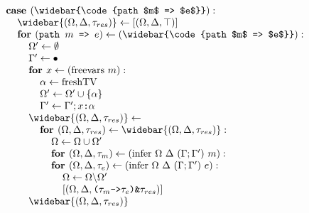 \documentclass[acmsmall]{acmart}
\begin{document}
\begin{figure*}[h]
\[\begin{array}[t]{@{} l}
    \\

    \I \B{case } (\widebar{\code{path $m$ => $e$}})  :  
    \\
    \I\I \widebar{(\Omega, \Delta, \tau_{res})} \leftarrow [(\Omega, \Delta, \top)]
    \\
    \I\I \B{for } (\code{path $m$ => $e$}) \leftarrow (\widebar{\code{path $m$ => $e$}}): 
    \\
    \I\I\I \Omega' \leftarrow \emptyset
    \\
    \I\I\I \Gamma' \leftarrow \bullet
    \\
    \I\I\I \B{for } x \leftarrow (\F{freevars } m):
    \\
    \I\I\I\I \alpha \leftarrow \F{freshTV} 
    \\
    \I\I\I\I \Omega' \leftarrow \Omega' \cup \{\alpha\} 
    \\
    \I\I\I\I \Gamma' \leftarrow \Gamma';\code{$x$:$\alpha$}
    \\
    \I\I\I \widebar{(\Omega, \Delta, \tau_{res})} \leftarrow
    \\
    \I\I\I\I \B{for } (\Omega, \Delta, \tau_{res}) \leftarrow \widebar{(\Omega, \Delta, \tau_{res})}: 
    \\
    \I\I\I\I\I \Omega \leftarrow \Omega \cup \Omega'
    \\
    \I\I\I\I\I \B{for } (\Omega, \Delta, \tau_{m}) \leftarrow (\F{infer } \Omega\ \Delta\ (\Gamma;\Gamma')\ m): 
    \\
    \I\I\I\I\I \B{for } (\Omega, \Delta, \tau_{e}) \leftarrow (\F{infer } \Omega\ \Delta\ (\Gamma;\Gamma')\ e): 
    \\
    \I\I\I\I\I\I \Omega \leftarrow \Omega \backslash \Omega'
    \\
    \I\I\I\I\I\I [(\Omega, \Delta, \code{($\tau_{m}$->$\tau_{e}$)\&$\tau_{res}$})]
    \\
    \I\I\I \widebar{(\Omega, \Delta, \tau_{res})}

    \\


\end{array}\]
\end{figure*}
\end{document}
